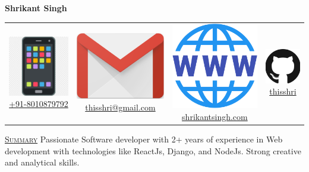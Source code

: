 \documentclass[11pt, a4paper]{article}
\begin{document}
\begin{center}
    \textbf{{\huge Shrikant Singh}}
\end{center}
\begin{center}
    \begin{tabular}{ c | c | c | c}
        \includegraphics[height=.018\textwidth]{phone} \href{tel:+918010879792}{+91-8010879792} &
        \includegraphics[height=.018\textwidth]{gmail} \href{mailto:thisshri@gmail.com} {thisshri@gmail.com} &
        \includegraphics[height=.018\textwidth]{web} \href{https://shrikantsingh.com} {shrikantsingh.com}&
        \includegraphics[height=.018\textwidth]{github} \href{https://github.com/thisshri} {thisshri} \\
    \end{tabular}
\end{center}

\begin{flushleft}
    \uline{\textsc{\large{Summary}}\hfill}
    \newline
    \newline
    Passionate Software developer with 2+ years of experience in Web development with technologies like ReactJs, Django, and NodeJs. Strong creative and analytical skills.
\end{flushleft}
\end{document}
